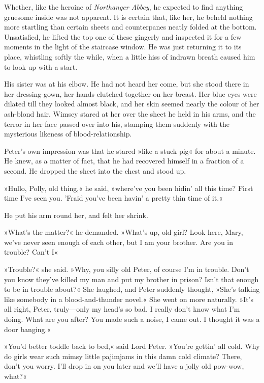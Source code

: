 Whether, like the heroine of \textit{Northanger Abbey}, he expected to find anything gruesome inside was not apparent. It is certain that, like her, he beheld nothing more startling than certain sheets and counterpanes neatly folded at the bottom. Unsatisfied, he lifted the top one of these gingerly and inspected it for a few moments in the light of the staircase window. He was just returning it to its place, whistling softly the while, when a little hiss of indrawn breath caused him to look up with a start.

His sister was at his elbow. He had not heard her come, but she stood there in her dressing-gown, her hands clutched together on her breast.  Her blue eyes were dilated till they looked almost black, and her skin seemed nearly the colour of her ash-blond hair. Wimsey stared at her over the sheet he held in his arms, and the terror in her face passed over into his, stamping them suddenly with the mysterious likeness of blood-relationship.

Peter's own impression was that he stared »like a stuck pig« for about a minute. He knew, as a matter of fact, that he had recovered himself in a fraction of a second. He dropped the sheet into the chest and stood up.

»Hullo, Polly, old thing,« he said, »where've you been hidin' all this time? First time I've seen you. 'Fraid you've been havin' a pretty thin time of it.«

He put his arm round her, and felt her shrink.

»What's the matter?« he demanded. »What's up, old girl? Look here, Mary, we've never seen enough of each other, but I am your brother. Are you in trouble? Can't I\longdash«

»Trouble?« she said. »Why, you silly old Peter, of course I'm in trouble. Don't you know they've killed my man and put my brother in prison? Isn't that enough to be in trouble about?« She laughed, and Peter suddenly thought, »She's talking like somebody in a blood-and-thunder novel.« She went on more naturally. »It's all right, Peter, truly\allowbreak---\allowbreak only my head's so bad. I really don't know what I'm doing. What are you after? You made such a noise, I came out. I thought it was a door banging.«

»You'd better toddle back to bed,« said Lord Peter. »You're gettin' all cold. Why do girls wear such mimsy little pajimjams in this damn cold climate? There, don't you worry. I'll drop in on you later and we'll have a jolly old pow-wow, what?«

